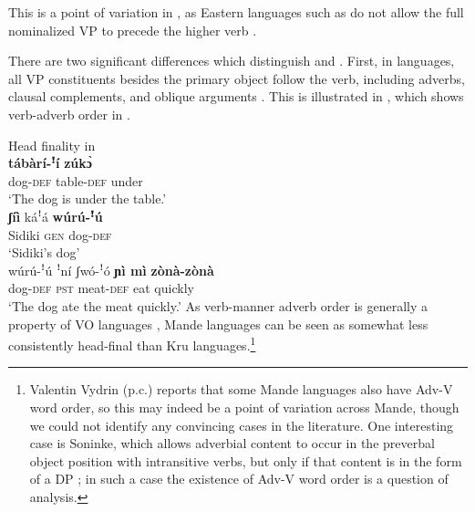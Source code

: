 \documentclass[output=paper,newtxmath,modfonts,nonflat,draftmode]{langsci/langscibook}
\begin{document}
This is a point of variation in , as Eastern  languages such as  do not allow the full nominalized VP to precede the higher verb \citep{nikitina09}.

There are two significant differences which distinguish  and . First, in  languages, all VP constituents besides the primary object follow the verb, including adverbs, clausal complements, and oblique arguments \citep{nikitina09}. This is illustrated in , which shows verb-adverb order in .

\ea Head finality in  \label{ex:8:dafing}
 \\
 \textbf{{tábàrí-ꜝí}} \textbf{{zúk{\`ɔ}}} \\
dog-\textsc{def} table-\textsc{def} under \\
\glt  `The dog is under the table.'  \label{ex:8a:dafing}
\\
\gll \textbf{{ʃíì}} káꜝá \textbf{{wúrú-ꜝú}} \\
Sidiki \textsc{gen} dog-\textsc{def} \\
\glt `Sidiki's dog' \label{ex:8b:dafing}
\newpage 
{}\\
\gll wúrú-ꜝú {ꜝ{ní}} {ʃwó-ꜝó} \textbf{{ɲì mì}} \textbf{{zònà-zònà}} \\
{dog}-\textsc{def} \textsc{pst} meat-\textsc{def} eat quickly\\
\glt `The dog ate the meat quickly.' \label{ex:8c:dafing}
\z
\z
As verb-manner adverb order is generally a property of VO languages \citep{dryer07}, Mande languages can be seen as somewhat less consistently head-final than Kru languages.\footnote{Valentin Vydrin (p.c.) reports that some Mande languages also have Adv-V word order, so this may indeed be a point of variation across Mande, though we could not identify any convincing cases in the literature. One interesting case is Soninke, which allows adverbial content to occur in the preverbal object position with intransitive verbs, but only if that content is in the form of a DP \citep{creissels2017}; in such a case the existence of Adv-V word order is a question of analysis.}
\end{document}
